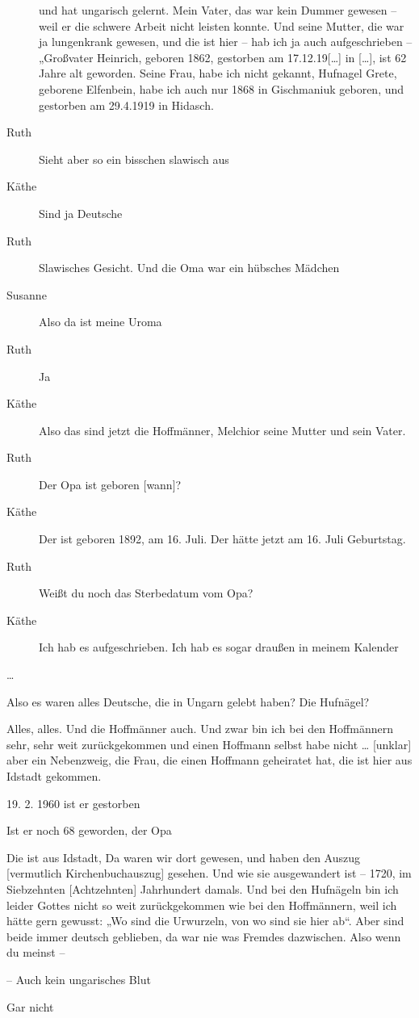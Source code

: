 \documentclass[ngerman,]{article}
\providecommand{\tightlist}{%
  \setlength{\itemsep}{0pt}\setlength{\parskip}{0pt}}
\begin{document}
\begin{multicols}{2}
\begin{description}
und hat ungarisch gelernt. Mein Vater, das war kein Dummer gewesen –
weil er die schwere Arbeit nicht leisten konnte. Und seine Mutter, die
war ja lungenkrank gewesen, und die ist hier – hab ich ja auch
aufgeschrieben – „Großvater Heinrich, geboren 1862, gestorben am
17.12.19{[}\ldots{}{]} in {[}\ldots{}{]}, ist 62 Jahre alt geworden.
Seine Frau, habe ich nicht gekannt, Hufnagel Grete, geborene Elfenbein,
habe ich auch nur 1868 in Gischmaniuk geboren, und gestorben am
29.4.1919 in Hidasch.
\item[Ruth]
Sieht aber so ein bisschen slawisch aus
\item[Käthe]
Sind ja Deutsche
\item[Ruth]
Slawisches Gesicht. Und die Oma war ein hübsches Mädchen
\item[Susanne]
Also da ist meine Uroma
\item[Ruth]
Ja
\item[Käthe]
Also das sind jetzt die Hoffmänner, Melchior seine Mutter und sein
Vater.
\item[Ruth]
Der Opa ist geboren {[}wann{]}?
\item[Käthe]
Der ist geboren 1892, am 16. Juli. Der hätte jetzt am 16. Juli
Geburtstag.
\item[Ruth]
Weißt du noch das Sterbedatum vom Opa?
\item[Käthe]
Ich hab es aufgeschrieben. Ich hab es sogar draußen in meinem Kalender
\end{description}

\ldots{}

\begin{description}
\tightlist
\item[Susanne]
Also es waren alles Deutsche, die in Ungarn gelebt haben? Die Hufnägel?
\item[Käthe]
Alles, alles. Und die Hoffmänner auch. Und zwar bin ich bei den
Hoffmännern sehr, sehr weit zurückgekommen und einen Hoffmann selbst
habe nicht \ldots{} {[}unklar{]} aber ein Nebenzweig, die Frau, die
einen Hoffmann geheiratet hat, die ist hier aus Idstadt gekommen.
\item[Friedrich]
19. 2. 1960 ist er gestorben
\item[Ruth]
Ist er noch 68 geworden, der Opa
\item[Käthe]
Die ist aus Idstadt, Da waren wir dort gewesen, und haben den Auszug
{[}vermutlich Kirchenbuchauszug{]} gesehen. Und wie sie ausgewandert ist
– 1720, im Siebzehnten {[}Achtzehnten{]} Jahrhundert damals. Und bei den
Hufnägeln bin ich leider Gottes nicht so weit zurückgekommen wie bei den
Hoffmännern, weil ich hätte gern gewusst: „Wo sind die Urwurzeln, von wo
sind sie hier ab“. Aber sind beide immer deutsch geblieben, da war nie
was Fremdes dazwischen. Also wenn du meinst –
\item[Ruth]
– Auch kein ungarisches Blut
\item[Käthe]
Gar nicht
\end{description}


\end{multicols}
\end{document}
